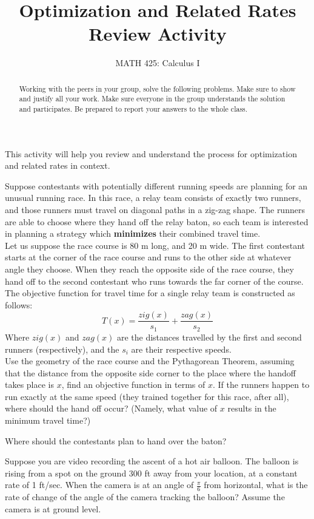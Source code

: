 \documentclass{ximera}
\title{Optimization and Related Rates Review Activity}
\author{MATH 425: Calculus I}
\begin{document}
\begin{abstract}
   Working with the peers in your group, solve the following problems. Make sure to show and justify all your work. Make sure everyone in the group understands the solution and participates. Be prepared to report your answers to the whole class. 
\end{abstract}
\maketitle

This activity will help you review and understand the process for optimization and related rates in context.

\begin{exercise}
Suppose contestants with potentially different running speeds are planning for an unusual running race.  In this race, a relay team consists of exactly two runners, and those runners must travel on diagonal paths in a zig-zag shape.  The runners are able to choose where they hand off the relay baton, so each team is interested in planning a strategy which \textbf{minimizes} their combined travel time. \\
Let us suppose the race course is 80 m long, and 20 m wide. The first contestant starts at the corner of the race course and runs to the other side at whatever angle they choose.  When they reach the opposite side of the race course, they hand off to the second contestant who runs towards the far corner of the course.\\
The objective function for travel time for a single relay team is constructed as follows: $$T(x)=\frac{zig(x)}{s_1}+\frac{zag(x)}{s_2}$$
Where $zig(x)$ and $zag(x)$ are the distances travelled by the first and second runners (respectively), and the $s_i$ are their respective speeds.\\
Use the geometry of the race course and the Pythagorean Theorem, assuming that the distance from the opposite side corner to the place where the handoff takes place is $x$, find an objective function in terms of $x$.  If the runners happen to run exactly at the same speed (they trained together for this race, after all), where should the hand off occur? (Namely, what value of $x$ results in the minimum travel time?)

Where should the contestants plan to hand over the baton?\\
\end{exercise}

\begin{exercise}
Suppose you are video recording the ascent of a hot air balloon.  The balloon is rising from a spot on the ground 300 ft away from your location, at a constant rate of 1 ft/sec.  When the camera is at an angle of $\frac{\pi}{6}$ from horizontal, what is the rate of change of the angle of the camera tracking the balloon?  Assume the camera is at ground level.
\end{exercise}
\end{document}

